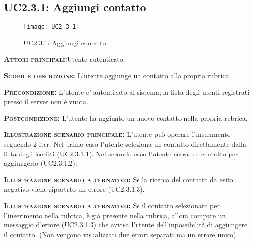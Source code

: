 \subsection{UC2.3.1: Aggiungi contatto}
\begin{figure}[H]
\begin{center}
\texttt{[image: UC2-3-1]}
\caption{UC2.3.1: Aggiungi contatto}\label{fig:aggiungi_contatto}
\end{center}
\end{figure}
\begin{description}
\item{\scshape\bfseries Attori principali:}Utente autenticato.
\item{\scshape\bfseries Scopo e descrizione:} L'utente aggiunge un contatto alla propria rubrica.
\item{\scshape\bfseries Precondizione:} L'utente e' autenticato al sistema; la lista degli utenti registrati presso il server non è vuota.
\item{\scshape\bfseries Postcondizione:} L'utente ha aggiunto un nuovo contatto nella propria rubrica.
\item{\scshape\bfseries Illustrazione scenario principale:} L'utente può operare l'inserimento seguendo 2 iter. Nel primo caso l'utente seleziona un contatto direttamente dalla lista degli iscritti (UC2.3.1.1). Nel secondo caso l'utente cerca un contatto per aggiungerlo (UC2.3.1.2).
\item{\scshape\bfseries Illustrazione scenario alternativo:} Se la ricerca del contatto da esito negativo viene riportato un errore (UC2.3.1.3).
\item{\scshape\bfseries Illustrazione scenario alternativo:} Se il contatto selezionato per l'inserimento nella rubrica, è già presente nella rubrica, allora compare un messaggio d'errore (UC2.3.1.3) che avvisa l'utente dell'inpossibilità di aggiungere il contatto. (Non vengono visualizzati due errori separati ma un errore unico).
\end{description}

